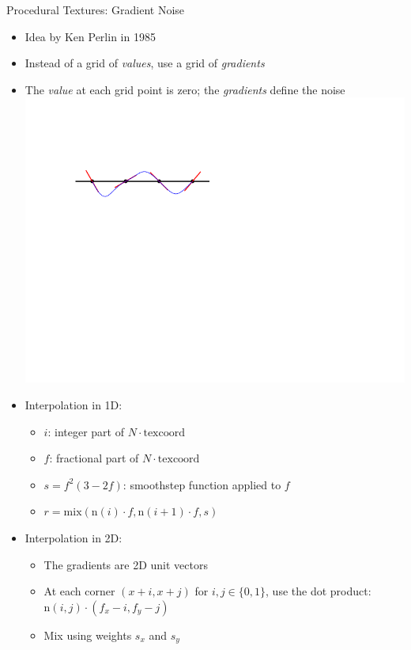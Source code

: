\documentclass[utf8,stillsansserifmath,fleqn,t]{beamer}
\begin{document}
\begin{frame}[label=noise-2]
\frametitle{\insertsection}
Procedural Textures: Gradient Noise
\begin{itemize}
\item Idea by Ken Perlin in 1985
\item Instead of a grid of \emph{values}, use a grid of \emph{gradients}
\item The \emph{value} at each grid point is zero; the \emph{gradients}
define the noise\\
    \includegraphics[width=.6\textwidth]{./fig/gradient-noise.pdf}    
\item Interpolation in 1D:
    \begin{itemize}
    \item $i$: integer part of $N \cdot \text{texcoord}$
    \item $f$: fractional part of $N \cdot \text{texcoord}$
    \item $s = f^2  (3-2f)$: smoothstep function applied to $f$
    \item $r = \text{mix}(\text{n}(i)\cdot f, \text{n}(i+1)\cdot f, s)$
    \end{itemize}
\item Interpolation in 2D:
    \begin{itemize}
    \item The gradients are 2D unit vectors
    \item At each corner $(x+i,x+j)$ for $i,j\in\{0,1\}$,
    use the dot product: $\text{n}(i,j) \cdot{(f_x-i,f_y-j)}$
    \item Mix using weights $s_x$ and $s_y$
    \end{itemize}
\end{itemize}
\end{frame}
\end{document}
